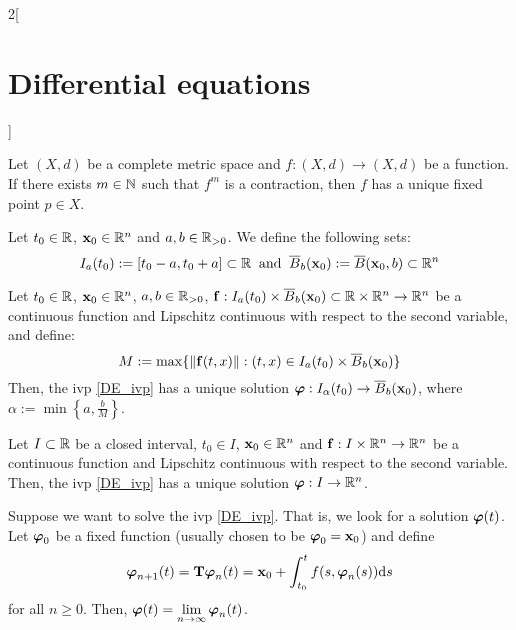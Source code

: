 \documentclass[../../../main.tex]{subfiles}
\begin{document}
\begin{multicols}{2}[\section{Differential equations}]
\begin{theorem}
  \end{theorem}
  \begin{corollary}
    Let $(X,d)$ be a complete metric space and $f:(X,d)\rightarrow (X,d)$ be a function. If there exists $m\in\mathbb{N}$ such that $f^m$ is a contraction, then $f$ has a unique fixed point $p\in X$.
  \end{corollary}
  \begin{definition}
    Let $t_0\in\mathbb{R}$, $\boldsymbol{\mathrm{x}}_0\in\mathbb{R}^n$ and $a,b\in\mathbb{R}_{>0}$. We define the following sets: $$I_a(t_0):=[t_0-a,t_0+a]\subset\mathbb{R}\;\;\text{and}\;\;\overline{B}_{b}(\boldsymbol{\mathrm{x}}_0):=\overline{B}(\boldsymbol{\mathrm{x}}_0,b)\subset\mathbb{R}^n$$
  \end{definition}
  \begin{theorem}\label{DE_picard}
    Let $t_0\in\mathbb{R}$, $\boldsymbol{\mathrm{x}}_0\in\mathbb{R}^n$, $a,b\in\mathbb{R}_{>0}$, $\boldsymbol{\mathrm{f}}:I_a(t_0)\times\overline{B}_{b}(\boldsymbol{\mathrm{x}}_0)\subset\mathbb{R}\times\mathbb{R}^n\rightarrow\mathbb{R}^n$ be a continuous function and Lipschitz continuous with respect to the second variable, and define: $$M:=\max\{\|\boldsymbol{\mathrm{f}}(t,x)\|:(t,x)\in I_a(t_0)\times\overline{B}_{b}(\boldsymbol{\mathrm{x}}_0)\}$$ Then, the ivp \eqref{DE_ivp} has a unique solution $\boldsymbol{\mathrm{\varphi}}:I_\alpha(t_0)\rightarrow\overline{B}_{b}(\boldsymbol{\mathrm{x}}_0)$, where $\alpha:=\min\left\{a,\frac{b}{M}\right\}$.
  \end{theorem}
  \begin{corollary}
    Let $I\subset \mathbb{R}$ be a closed interval, $t_0\in I$, $\boldsymbol{\mathrm{x}}_0\in\mathbb{R}^n$ and $\boldsymbol{\mathrm{f}}:I\times\mathbb{R}^n\rightarrow\mathbb{R}^n$ be a continuous function and Lipschitz continuous with respect to the second variable. Then, the ivp \eqref{DE_ivp} has a unique solution $\boldsymbol{\mathrm{\varphi}}:I\rightarrow\mathbb{R}^n$.
  \end{corollary}
  \begin{corollary}
    Suppose we want to solve the ivp \eqref{DE_ivp}. That is, we look for a solution $\boldsymbol{\mathrm{\varphi}}(t)$. Let $\boldsymbol{\mathrm{\varphi}}_0$ be a fixed function (usually chosen to be $\boldsymbol{\mathrm{\varphi}}_0=\boldsymbol{\mathrm{x}}_0$) and define
    $$\boldsymbol{\mathrm{\varphi}}_{n+1}(t)=\boldsymbol{\mathrm{T}}\boldsymbol{\mathrm{\varphi}}_n(t)=\boldsymbol{\mathrm{x}}_0+\int_{t_0}^tf(s,\boldsymbol{\mathrm{\varphi}}_n(s))\dd s$$
    for all $n\geq 0$. Then, $\displaystyle\boldsymbol{\mathrm{\varphi}}(t)=\lim_{n\to\infty}\boldsymbol{\mathrm{\varphi}}_n(t)$.
  \end{corollary}
  \begin{corollary}

\end{corollary}
\end{multicols}
\end{document}

